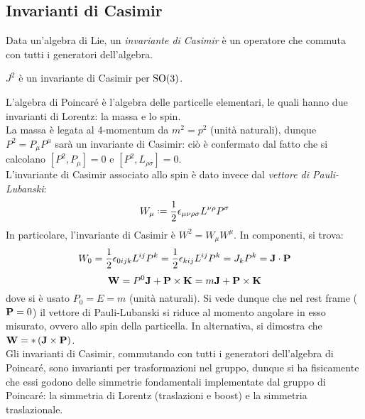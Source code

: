 \subsection{Invarianti di Casimir}

\begin{definition}
	Data un'algebra di Lie, un \textit{invariante di Casimir} è un operatore che commuta con tutti i generatori dell'algebra.
\end{definition}

\begin{example}
	$ J^2 $ è un invariante di Casimir per $ \mathrm{SO}(3) $.
\end{example}

L'algebra di Poincaré è l'algebra delle particelle elementari, le quali hanno due invarianti di Lorentz: la massa e lo spin.\\
La massa è legata al 4-momentum da $ m^2 = p^2 $ (unità naturali), dunque $ P^2 = P_{\mu} P^{\mu} $ sarà un invariante di Casimir: ciò è confermato dal fatto che si calcolano $ \left[ P^2, P_{\mu} \right] = 0 $ e $ \left[ P^2, L_{\rho \sigma} \right] = 0 $.\\
L'invariante di Casimir associato allo spin è dato invece dal \textit{vettore di Pauli-Lubanski}:
\begin{equation}
	W_{\mu} \defeq \frac{1}{2} \epsilon_{\mu \nu \rho \sigma} L^{\nu \rho} P^{\sigma}
	\label{eq:10.42}
\end{equation}
In particolare, l'invariante di Casimir è $ W^2 = W_{\mu} W^{\mu} $. In componenti, si trova:
\begin{equation*}
	W_0 = \frac{1}{2} \epsilon_{0ijk} L^{ij} P^{k} =  \frac{1}{2} \epsilon_{kij} L^{ij} P^k = J_k P^k = \mathbf{J} \cdot \mathbf{P}
\end{equation*}
\begin{equation*}
	\mathbf{W} = P^0 \mathbf{J} + \mathbf{P} \times \mathbf{K} = m\mathbf{J} + \mathbf{P} \times \mathbf{K}
\end{equation*}
dove si è usato $ P_0 = E = m $ (unità naturali). Si vede dunque che nel rest frame ($ \mathbf{P} = 0 $) il vettore di Pauli-Lubanski si riduce al momento angolare in esso misurato, ovvero allo spin della particella. In alternativa, si dimostra che $ \mathbf{W} = * \left( \mathbf{J} \times \mathbf{P} \right) $.\\
Gli invarianti di Casimir, commutando con tutti i generatori dell'algebra di Poincaré, sono invarianti per trasformazioni nel gruppo, dunque si ha fisicamente che essi godono delle simmetrie fondamentali implementate dal gruppo di Poincaré: la simmetria di Lorentz (traslazioni e boost) e la simmetria traslazionale.










